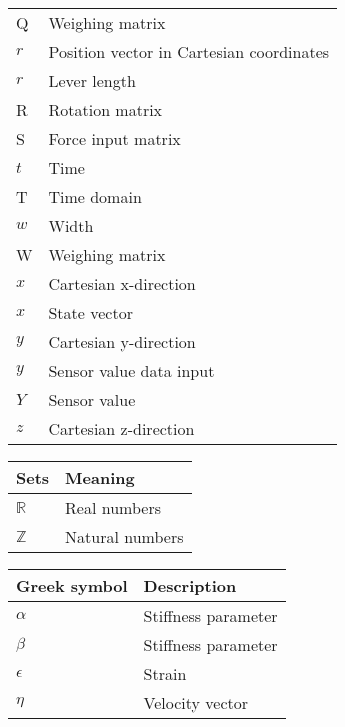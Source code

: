 \begin{spacing}{0.9}
\begin{multicols}{2}
\begin{table}[H]
\begin{tabular}{p{1.5cm} p{5cm}}
    Q     & Weighing matrix \\
    $r$     & Position vector in Cartesian coordinates \\
    $r$     & Lever length \\
    R     & Rotation matrix \\
    S     & Force input matrix \\
    $t$     & Time \\
    T     & Time domain \\
    $w$     & Width \\
    W     & Weighing matrix \\
    $x$     & Cartesian x-direction \\
    $x$     & State vector \\
    $y$     & Cartesian y-direction \\
    $y$     & Sensor value data input \\
    $Y$     & Sensor value \\
    $z$     & Cartesian z-direction \\ \hline
    \end{tabular}
\end{table}

\begin{table}[H]
\centering
    \begin{tabular}{p{1.5cm} p{5cm}} \hline
    \textbf{Sets}    &   \textbf{Meaning }\\ \hline
    $\mathbb{R}$     &  Real numbers \\
    $\mathbb{Z}$     &  Natural numbers \\  \hline
    \end{tabular}
\end{table}



\begin{table}[H]
\centering
    \begin{tabular}{p{2.8cm} p{3.2cm}} \hline
    \textbf{Greek symbol}    &   \textbf{Description }\\ \hline
    $\alpha$     &  Stiffness parameter \\
    $\beta$     &  Stiffness parameter \\
    $\epsilon$     &  Strain \\
    $\eta$     &  Velocity vector \\
    

\end{tabular}
\end{table}
\end{multicols}
\end{spacing}
